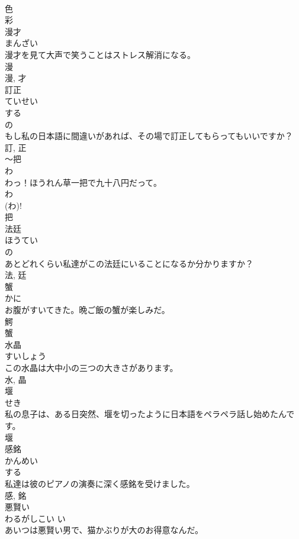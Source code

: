 \documentclass[8pt]{extreport}
\begin{document}
\begin{CJK}{UTF8}{min}
\\	色 
\\	彩	
\\	漫才	
\\	まんざい	
\\	漫才を見て大声で笑うことはストレス解消になる。	
\\	漫 
\\	漫, 才	
\\	訂正	
\\	ていせい	
\\	する 
\\	の 
\\	もし私の日本語に間違いがあれば、その場で訂正してもらってもいいですか？	
\\	訂, 正	
\\	〜把	
\\	わ	
\\	わっ！ほうれん草一把で九十八円だって。	
\\	わ 
\\	(わ)!
\\	把	
\\	法廷	
\\	ほうてい	
\\	の 
\\	あとどれくらい私達がこの法廷にいることになるか分かりますか？	
\\	法, 廷	
\\	蟹	
\\	かに	
\\	お腹がすいてきた。晩ご飯の蟹が楽しみだ。	
\\	鰐 
\\	蟹	
\\	水晶	
\\	すいしょう	
\\	この水晶は大中小の三つの大きさがあります。	
\\	水, 晶	
\\	堰	
\\	せき	
\\	私の息子は、ある日突然、堰を切ったように日本語をペラペラ話し始めたんです。	
\\	堰	
\\	感銘	
\\	かんめい	
\\	する 
\\	私達は彼のピアノの演奏に深く感銘を受けました。	
\\	感, 銘	
\\	悪賢い	
\\	わるがしこい	い 
\\	あいつは悪賢い男で、猫かぶりが大のお得意なんだ。	

\end{CJK}
\end{document}
